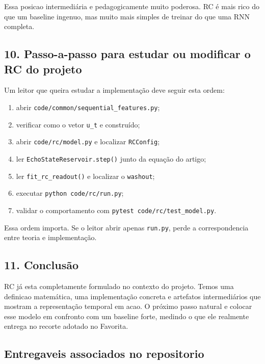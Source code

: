 \documentclass[12pt]{article}
\providecommand{\tightlist}{%
          \setlength{\itemsep}{0pt}\setlength{\parskip}{0pt}}
\begin{document}
Essa posicao intermediária e pedagogicamente muito poderosa. RC é mais rico do que um baseline ingenuo, mas muito mais simples de treinar do que uma RNN completa.

\subsection{10. Passo-a-passo para estudar ou modificar o RC do projeto}\label{10-passo-a-passo-para-estudar-ou-modificar-o-rc-do-projeto}

Um leitor que queira estudar a implementação deve seguir esta ordem:

\begin{enumerate}
\def\labelenumi{\arabic{enumi}.}
\tightlist
\item
  abrir \texttt{code/common/sequential\_features.py};
\item
  verificar como o vetor \texttt{u\_t} e construído;
\item
  abrir \texttt{code/rc/model.py} e localizar \texttt{RCConfig};
\item
  ler \texttt{EchoStateReservoir.step()} junto da equação do artigo;
\item
  ler \texttt{fit\_rc\_readout()} e localizar o \texttt{washout};
\item
  executar \texttt{python\ code/rc/run.py};
\item
  validar o comportamento com \texttt{pytest\ code/rc/test\_model.py}.
\end{enumerate}

Essa ordem importa. Se o leitor abrir apenas \texttt{run.py}, perde a correspondencia entre teoria e implementação.

\subsection{11. Conclusão}\label{11-conclusuxe3o}

RC já esta completamente formulado no contexto do projeto. Temos uma definicao matemática, uma implementação concreta e artefatos intermediários que mostram a representação temporal em acao. O próximo passo natural e colocar esse modelo em confronto com um baseline forte, medindo o que ele realmente entrega no recorte adotado no Favorita.

\subsection{Entregaveis associados no repositorio}\label{entregaveis-associados-no-repositorio}
\end{document}
